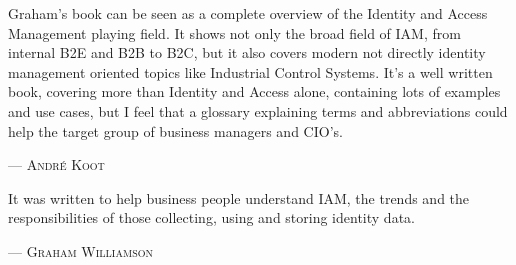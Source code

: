 Graham's book can be seen as a complete overview of the Identity and Access Management playing field. It shows not only the broad field of IAM, from internal B2E and B2B to B2C, but it also covers modern not directly identity management oriented topics like Industrial Control Systems. It's a well written book, covering more than Identity and Access alone, containing lots of examples and use cases, but I feel that a glossary explaining terms and abbreviations could help the target group of business managers and CIO's.
\setlength{\parindent}{0cm}\par\textsc{ --- André Koot }\par\vspace{12pt}\setlength{\parindent}{15pt}
It was written to help business people understand IAM, the trends and the responsibilities of those collecting, using and storing identity data.
\setlength{\parindent}{0cm}\par\textsc{ --- Graham Williamson }\par\vspace{12pt}\setlength{\parindent}{15pt}

